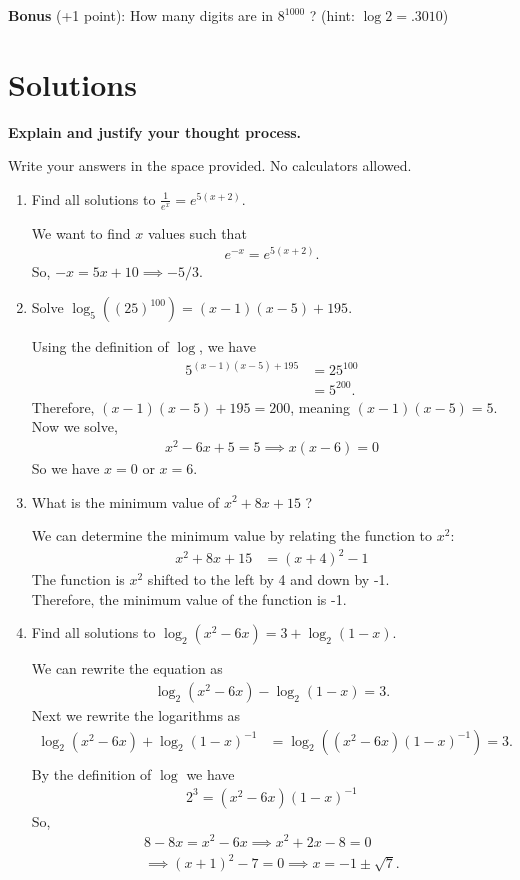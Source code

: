 \documentclass[a4paper, 12pt]{article}
\newcommand{\bt}[1]{\textbf{#1}} %
\newcommand{\eq}[1]{\begin{align*}#1\end{align*}} %
\renewcommand{\eq}[1]{\begin{align*}#1\end{align*}} %
\newcommand{\green}[1]{\textcolor{javagreen}{#1}} %
\begin{document}
\bt{Bonus} (+1 point): How many digits are in $8^{1000}$ ? (hint: $\log 2 = .3010$) 

\newpage

\section*{Solutions}

\bt{Explain and justify your thought process.}

Write your answers in the space provided. No calculators allowed.

\begin{enumerate}
    \item Find all solutions to $\frac{1}{e^x} = e^{5(x+2)}$.

    \green{
    We want to find $x$ values such that 
    \eq{
    e^{-x} = e^{5(x+2)}.
    }
    So, $-x = 5x + 10 \implies -5/3$.
    }
    \item Solve $\log_5 ((25)^{100}) = (x-1)(x-5) + 195$.

    \green{
    Using the definition of $\log$, we have
    \eq{
    5^{(x-1)(x-5)+195} &= 25^{100} \\
    & = 5^{200}.
    }
    Therefore, $(x-1)(x-5) + 195 = 200$, meaning $(x-1)(x-5) = 5$. \\
    Now we solve, 
    \eq{
    x^2 -6x + 5 = 5 \implies x(x-6) = 0 
    }
    So we have $x = 0$ or $x = 6$.
    }
    \item What is the minimum value of $x^2 + 8x + 15$ ?

    \green{
    We can determine the minimum value by relating the function to $x^2$: 
    \eq{
    x^2 + 8x + 15 &= (x+4)^2 -1 
    }
    The function is $x^2$ shifted to the left by 4 and down by -1.  \\
    Therefore, the minimum value of the function is -1.
    }
    \item Find all solutions to $\log_2 (x^2 - 6x) = 3 + \log_2 (1-x)$.

    \green{
    We can rewrite the equation as 
    \eq{
    \log_2(x^2 - 6x) - \log_2(1-x) = 3.
    }
    Next we rewrite the logarithms as 
    \eq{
    \log_2(x^2 -6x) + \log_2(1-x)^{-1} &= 
    \log_2((x^2 - 6x)(1-x)^{-1}) = 3.\\
    }
    By the definition of $\log$ we have
    \eq{
    2^3 = (x^2 - 6x)(1-x)^{-1}
    }
    So, 
    \eq{
    8 - 8x = x^2 -6x \implies x^2 +2x - 8 = 0\\
    \implies (x+1)^2 -7 = 0 \implies x = -1 \pm \sqrt{7}.
    }
    }
\end{enumerate}
\end{document}
